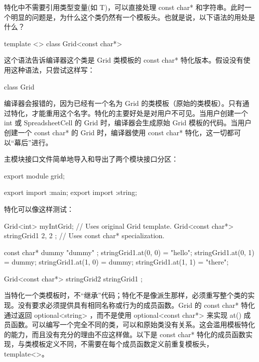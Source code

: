 特化中不需要引用类型变量(如 T)，可以直接处理 const char* 和字符串。此时一个明显的问题是，为什么这个类仍然有一个模板头。也就是说，以下语法的用处是什么？

\begin{cpp}
template <>
class Grid<const char*>
\end{cpp}

这个语法告诉编译器这个类是 Grid 类模板的 const char* 特化版本。假设没有使用这种语法，只尝试这样写：

\begin{cpp}
class Grid
\end{cpp}

编译器会报错的，因为已经有一个名为 Grid 的类模板（原始的类模板）。只有通过特化，才能重用这个名字。特化的主要好处是对用户不可见。当用户创建一个 int 或 SpreadsheetCell 的 Grid 时，编译器会生成原始 Grid 模板的代码。当用户创建一个 const char* 的 Grid 时，编译器使用 const char* 特化，这一切都可以“幕后”进行。

主模块接口文件简单地导入和导出了两个模块接口分区：

\begin{cpp}
export module grid;

export import :main;
export import :string;
\end{cpp}

特化可以像这样测试：

\begin{cpp}
Grid<int> myIntGrid; // Uses original Grid template.
Grid<const char*> stringGrid1 { 2, 2 }; // Uses const char* specialization.

const char* dummy { "dummy" };
stringGrid1.at(0, 0) = "hello";
stringGrid1.at(0, 1) = dummy;
stringGrid1.at(1, 0) = dummy;
stringGrid1.at(1, 1) = "there";

Grid<const char*> stringGrid2 { stringGrid1 };
\end{cpp}

当特化一个类模板时，不“继承”代码；特化不是像派生那样，必须重写整个类的实现。没有要求必须提供具有相同名称或行为的成员函数。Grid 的 const char* 特化通过返回 optional<string> ，而不是使用 optional<const char*> 来实现 at() 成员函数。可以编写一个完全不同的类，可以和原始类没有关系。这会滥用模板特化的能力，而且没有充分的理由不应这样做。以下是 const char* 特化的成员函数实现，与类模板定义不同，不需要在每个成员函数定义前重复模板头，template<>。

